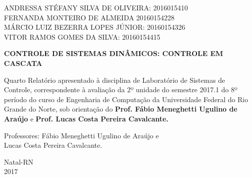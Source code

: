 \documentclass[a4paper,12pt]{article}
\begin{document}
\newpage


\thispagestyle{empty}

\begin{center}
\begin{normalsize}
ANDRESSA STÉFANY SILVA DE OLIVEIRA: 2016015410\\
\vspace{0.8cm}
FERNANDA MONTEIRO DE ALMEIDA 20160154228\\
\vspace{0.8cm}
MÁRCIO LUIZ BEZERRA LOPES JÚNIOR: 20160154326\\
\vspace{0.8cm}
VITOR RAMOS GOMES DA SILVA: 20160154415\\

\end{normalsize}
\end{center}
\vspace{3cm}

{\bf{\large {\centering CONTROLE DE SISTEMAS DINÂMICOS: CONTROLE EM CASCATA\\}}}

\vspace{4cm}

\begin{adjustwidth}{7.5cm}{0cm}

{\normalsize

Quarto Relatório apresentado à disciplina de
Laboratório de Sistemas de Controle, correspondente à
avaliação da 2º unidade do semestre 2017.1 do 8º período
do curso de Engenharia de Computação da
Universidade Federal do Rio Grande do Norte, sob
orientação do {\bf Prof. Fábio Meneghetti Ugulino de
Araújo} e {\bf Prof. Lucas Costa Pereira Cavalcante.}

}

\end{adjustwidth}

\vspace{2cm}

\begin{center}

Professores:  Fábio Meneghetti Ugulino de Araújo e\\
Lucas Costa Pereira Cavalcante.

\vspace{2.5cm}

{\large Natal-RN\\
2017}

\end{center}
\end{document}
